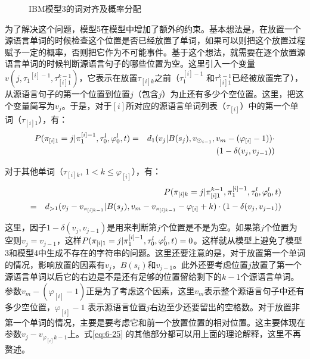 \begin{figure}[htp]
    \centering

    \caption{IBM模型3的词对齐及概率分配}
    \label{fig:6-9}
\end{figure}

\parinterval 为了解决这个问题，模型5在模型中增加了额外的约束。基本想法是，在放置一个源语言单词的时候检查这个位置是否已经放置了单词，如果可以则把这个放置过程赋予一定的概率，否则把它作为不可能事件。基于这个想法，就需要在逐个放置源语言单词的时候判断源语言句子的哪些位置为空。这里引入一个变量$v(j, {\tau_1}^{[i]-1}, \tau_{[i]1}^{k-1})$，它表示在放置$\tau_{[i]k}$之前（$\tau_1^{[i]-1}$ 和$\tau_{[i]1}^{k-1}$已经被放置完了），从源语言句子的第一个位置到位置$j$（包含$j$）为止还有多少个空位置。这里，把这个变量简写为$v_j$。于是，对于$[i]$所对应的源语言单词列表（$\tau_{[i]}$）中的第一个单词（$\tau_{[i]1}$），有：
\begin{eqnarray}
{P}(\pi_{[i]1} = j | \pi_1^{[i]-1}, \tau_0^l, \varphi_0^l, {t}) & = & d_1(v_j|B(s_j), v_{\odot_{i-1}}, v_m-(\varphi_{[i]}-1)) \cdot \nonumber \\
                                                                                                   &     & (1-\delta(v_j,v_{j-1}))
\label{eq:6-24}
\end{eqnarray}

\parinterval 对于其他单词（$\tau_{[i]k}$, $1 < k\le\varphi_{[i]}$），有：
\begin{eqnarray}
&   & {P}(\pi_{[i]k}=j|\pi_{[i]1}^{k-1}, \pi_1^{[i]-1}, \tau_0^l, \varphi_0^l,{t}) \nonumber \\
&= & d_{>1}(v_j-v_{\pi_{[i]k-1}}|B(s_j), v_m-v_{\pi_{[i]k-1}}-\varphi_{[i]}+k) \cdot (1-\delta(v_j,v_{j-1}))
\label{eq:6-25}
\end{eqnarray}

\noindent 这里，因子$1-\delta(v_j, v_{j-1})$是用来判断第$j$个位置是不是为空。如果第$j$个位置为空则$v_j = v_{j-1}$，这样${P}(\pi_{[i]1}=j|\pi_1^{[i]-1}, \tau_0^l, \varphi_0^l, {t}) = 0$。这样就从模型上避免了模型3和模型4中生成不存在的字符串的问题。这里还要注意的是，对于放置第一个单词的情况，影响放置的因素有$v_j$，$B(s_i)$和$v_{j-1}$。此外还要考虑位置$j$放置了第一个源语言单词以后它的右边是不是还有足够的位置留给剩下的$k-1$个源语言单词。参数$v_m-(\varphi_{[i]}-1)$正是为了考虑这个因素，这里$v_m$表示整个源语言句子中还有多少空位置，$\varphi_{[i]}-1$ 表示源语言位置$j$右边至少还要留出的空格数。对于放置非第一个单词的情况，主要是要考虑它和前一个放置位置的相对位置。这主要体现在参数$v_j-v_{\varphi_{[i]}k-1}$上。式\eqref{eq:6-25} 的其他部分都可以用上面的理论解释，这里不再赘述。

